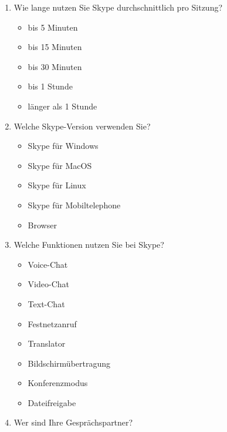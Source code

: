 \begin{enumerate}[resume]
\item Wie lange nutzen Sie Skype durchschnittlich pro Sitzung?

		\begin{itemize}
		\item[\Circle] bis 5 Minuten
        \item[\Circle] bis 15 Minuten
        \item[\Circle] bis 30 Minuten
        \item[\Circle] bis 1 Stunde
        \item[\Circle] länger als 1 Stunde
		\end{itemize}
        
\item Welche Skype-Version verwenden Sie?

		\begin{itemize}
		\item[\Circle] Skype für Windows
        \item[\Circle] Skype für MacOS
        \item[\Circle] Skype für Linux
        \item[\Circle] Skype für Mobiltelephone
        \item[\Circle] Browser
		\end{itemize}
        
\item Welche Funktionen nutzen Sie bei Skype?

		\begin{itemize}
		\item[\Circle] Voice-Chat
        \item[\Circle] Video-Chat
        \item[\Circle] Text-Chat
        \item[\Circle] Festnetzanruf
        \item[\Circle] Translator
        \item[\Circle] Bildschirmübertragung
        \item[\Circle] Konferenzmodus
        \item[\Circle] Dateifreigabe
		\end{itemize}
        
\item Wer sind Ihre Gesprächspartner?


\end{enumerate}
